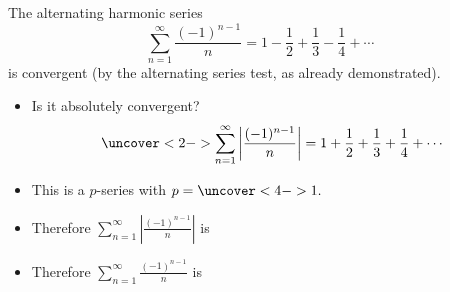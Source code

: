 \begin{frame}
\begin{example} %
The alternating harmonic series
\abovedisplayskip=0pt
\belowdisplayskip=0pt
\[
\sum_{n=1}^\infty \frac{(-1)^{n-1}}{n} = 1 - \frac{1}{2} + \frac{1}{3} - \frac{1}{4} + \cdots%
\]
is convergent (by the alternating series test, as already demonstrated).
\begin{itemize}
\item<2->  Is it absolutely convergent?
\[
\uncover<2->{%
\sum_{n=1}^\infty \left| \frac{(-1)^{n-1}}{n}\right|  = 1 + \frac{1}{2} + \frac{1}{3} + \frac{1}{4} + \cdots%
}%
\]
\item<3->  This is a $p$-series with \alert<handout:0| 3-4>{$p = \uncover<4->{1.}$}
\item<5->  Therefore $\sum_{n=1}^\infty \left|\frac{(-1)^{n-1}}{n}\right|$ is 
\item<5->  Therefore $\sum_{n=1}^\infty \frac{(-1)^{n-1}}{n}$ is 
\end{itemize}
\end{example}
\end{frame}
